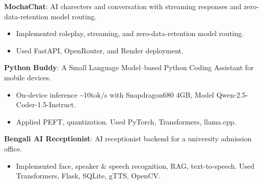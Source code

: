 
\begin{cvlistsection}

\item \textbf{MochaChat}: AI charecters and conversation with streaming responses and zero-data-retention model routing.
\href{https://mocha-chat.onrender.com/}{\textcolor{Cerulean}{\faExternalLink*}}
\begin{itemize}[leftmargin=2.5em, nosep, noitemsep]
  \item[\textendash] Implemented roleplay, streaming, and zero-data-retention model routing.
  \item[\textendash] Used FastAPI, OpenRouter, and Render deployment.
\end{itemize}

\item \textbf{Python Buddy}: A Small Language Model–based Python Coding Assistant for mobile devices.
\href{https://github.com/2ufiq/slm-python-buddy}{\faGithub}
\begin{itemize}[leftmargin=2.5em, nosep, noitemsep]
  \item[\textendash] On-device inference \~{}10tok/s with Snapdragon680 4GB, Model Qwen-2.5-Coder-1.5-Instruct. 
  \item[\textendash] Applied PEFT, quantization. Used PyTorch, Transformers, llama.cpp.
\end{itemize}

\item \textbf{Bengali AI Receptionist}: AI receptionist backend for a university admission office.
\href{https://github.com/2ufiq/Bengali-AI-Recieptionist}{\faGithub}
\begin{itemize}[leftmargin=2.5em, nosep, noitemsep]
  \item[\textendash] Implemented face, speaker \& speech recognition, RAG, text-to-speech. Used Transformers, Flask, SQLite, gTTS, OpenCV.
\end{itemize}
\end{cvlistsection}
